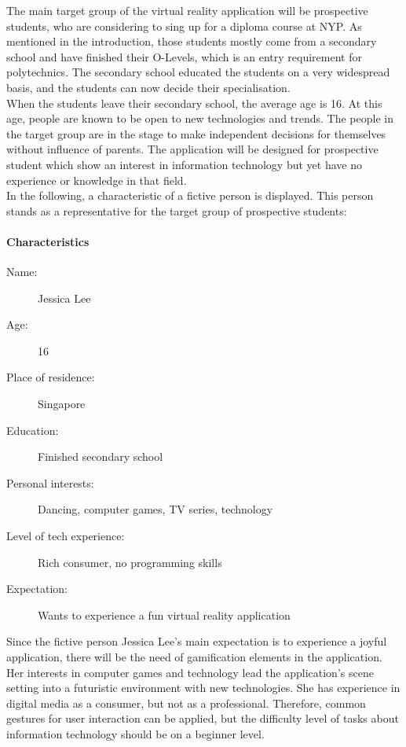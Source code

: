 The main target group of the virtual reality application will be prospective students, who are considering to sing up for a diploma course at NYP. As mentioned in the introduction, those students mostly come from a secondary school and have finished their O-Levels, which is an entry requirement for polytechnics. The secondary school educated the students on a very widespread basis, and the students can now decide their specialisation. \\
When the students leave their secondary school, the average age is 16. At this age, people are known to be open to new technologies and trends. The people in the target group are in the stage to make independent decisions for themselves without influence of parents. The application will be designed for prospective student which show an interest in information technology but yet have no experience or knowledge in that field.\\
In the following, a characteristic of a fictive person is displayed. This person stands as a representative for the target group of prospective students:

\paragraph{Characteristics}
\begin{description}
	\item[Name:] Jessica Lee
	\item[Age:] 16
	\item[Place of residence:] Singapore
	\item[Education:] Finished secondary school
	\item[Personal interests:] Dancing, computer games, TV series, technology
	\item[Level of tech experience:] Rich consumer, no programming skills
	\item[Expectation:] Wants to experience a fun virtual reality application
\end{description}
Since the fictive person Jessica Lee's main expectation is to experience a joyful application, there will be the need of gamification elements in the application. Her interests in computer games and technology lead the application's scene setting into a futuristic environment with new technologies. She has experience in digital media as a consumer, but not as a professional. Therefore, common gestures for user interaction can be applied, but the difficulty level of tasks about information technology should be on a beginner level. 
